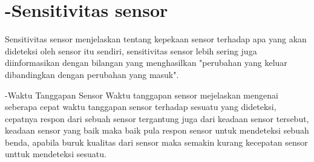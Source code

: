 \section{-Sensitivitas sensor}
Sensitivitas sensor menjelaskan tentang kepekaan sensor terhadap apa yang akan dideteksi oleh sensor itu sendiri,
sensitivitas sensor lebih sering juga diinformasikan dengan bilangan yang menghasilkan "perubahan yang keluar dibandingkan dengan perubahan yang masuk". 

-Waktu Tanggapan Sensor
Waktu tanggapan sensor mejelaskan mengenai seberapa cepat waktu tanggapan sensor terhadap sesuatu yang dideteksi,
cepatnya respon dari sebuah sensor tergantung juga dari keadaan sensor tersebut, keadaan sensor yang baik maka baik pula respon sensor untuk mendeteksi sebuah benda, apabila buruk kualitas dari sensor maka semakin kurang kecepatan sensor unttuk mendeteksi sesuatu.